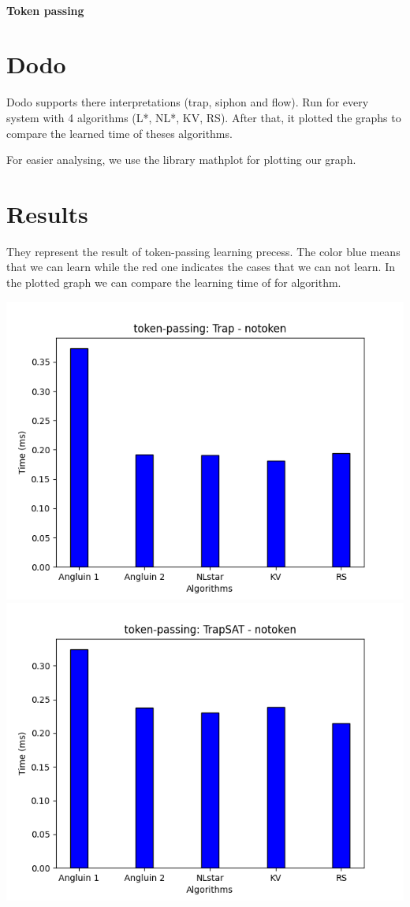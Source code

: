 \paragraph{Token passing}

\section{Dodo}
Dodo supports there interpretations (trap, siphon and flow).
Run for every system with  4 algorithms (L*, NL*, KV, RS). 
After that, it plotted the graphs to compare the learned time 
of theses algorithms.

For easier analysing, we use the library mathplot for 
plotting our graph.

\section{Results}
They represent the result of token-passing learning precess.
The color blue means that we can learn while the red one 
indicates the cases that we can not learn.
In the plotted graph we can compare the learning time of for 
algorithm.

\includegraphics[scale=0.5]{figures/Trap_notoken.png}
\includegraphics[scale=0.5]{figures/TrapSAT_notoken.png}

